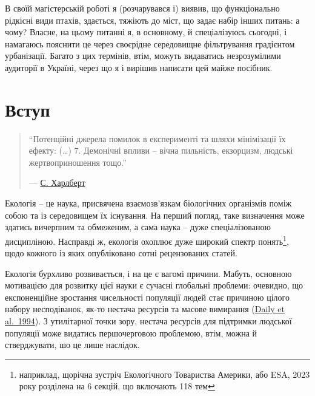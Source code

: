 \documentclass[
  11pt,
]{book}
\begin{document}
В своїй магістерській роботі я (розчарувався і) виявив, що функціонально
рідкісні види птахів, здається, тяжіють до міст, що задає набір інших
питань: а чому? Власне, на цьому питанні я, в основному, й спеціалізуюсь
сьогодні, і намагаюсь пояснити це через своєрідне середовищне
фільтрування градієнтом урбанізації. Багато з цих термінів, втім, можуть
видаватись незрозумілими аудиторії в Україні, через що я і вирішив
написати цей майже посібник.

\chapter{Вступ}\label{introduction}

\begin{quote}
``Потенційні джерела помилок в експерименті та шляхи мінімізації їх
ефекту: (\ldots) 7. Демонічні впливи -- вічна пильність, екзорцизм,
людські жертвоприношення тощо.''

--- \href{https://doi.org/10.2307/1942661}{С. Харлберт}
\end{quote}

Екологія -- це наука, присвячена взаємозв'язкам біологічних організмів
поміж собою та із середовищем їх існування. На перший погляд, таке
визначення може здатись вичерпним та обмеженим, а сама наука -- дуже
спеціалізованою дисципліною. Насправді ж, екологія охоплює дуже широкий
спектр понять\footnote{наприклад, щорічна зустріч Екологічного
  Товариства Америки, або ESA, 2023 року розділена на 6 секцій, що
  включають 118 тем}, щодо кожного із яких опубліковано сотні
рецензованих статей.

Екологія бурхливо розвивається, і на це є вагомі причини. Мабуть,
основною мотивацією для розвитку цієї науки є сучасні глобальні
проблеми: очевидно, що експоненційне зростання чисельності популяції
людей стає причиною цілого набору несподіванок, як-то нестача ресурсів
та масове вимирання (\href{https://www.jstor.org/stable/27503368}{Daily
et al.~1994}). З утилітарної точки зору, нестача ресурсів для підтримки
людської популяції може видатись першочерговою проблемою, втім, можна й
стверджувати, шо це лише наслідок.
\end{document}
